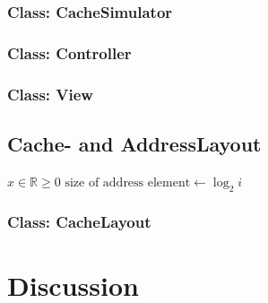 \documentclass[a4paper]{scrreprt}
\begin{document}
\subsection{Class: CacheSimulator}
\label{subsec:cachesimulator.java}


\subsection{Class: Controller}
\label{subsec:controller.java}


\subsection{Class: View}
\label{subsec:view.java}


\section{Cache- and AddressLayout}
\label{sec:cache}



\begin{algorithmic}
\State $x \in \mathbb{R} \geq 0$ 
    \State $\text{size of address element} \gets \log _2 i$ 
\EndIf
\end{algorithmic}

\subsection{Class: CacheLayout}
\label{subsec:cachelayout.java}



\chapter{Discussion}
\end{document}
